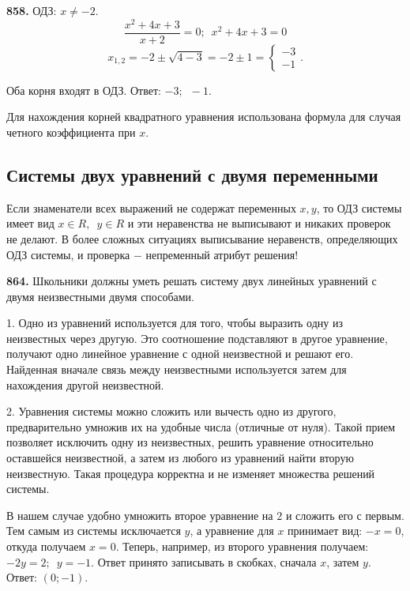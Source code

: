 \textbf{858.} ОДЗ: $x\ne-2$. $$\frac{x^2+4x+3}{x+2}=0;\enspace x^2+4x+3=0$$$$ x_{1,2}=-2\pm \sqrt{4-3}=-2\pm1=\begin{cases} -3 \\ -1 \end{cases}.$$
		
Оба корня входят в ОДЗ. \newline \null \hspace*{\fill} Ответ: $-3;\enspace -1$.

Для нахождения корней квадратного уравнения использована формула для случая четного коэффициента  при $x$. 


\subsection{Системы двух уравнений с двумя переменными}


Если знаменатели всех выражений не содержат переменных $x,y$, то ОДЗ системы имеет вид $x\in R,\enspace y\in R$ и эти неравенства не выписывают и никаких проверок не делают. В более сложных ситуациях выписывание неравенств, определяющих ОДЗ системы, и проверка $-$ непременный атрибут решения!  

\textbf{864.}  Школьники должны уметь решать систему двух линейных уравнений с двумя неизвестными  двумя способами.

1. Одно из уравнений используется для того, чтобы выразить  одну из неизвестных через другую. Это соотношение подставляют в другое уравнение, получают одно линейное уравнение с одной неизвестной и решают его. Найденная вначале связь между неизвестными используется затем для нахождения другой неизвестной.

2. Уравнения системы можно сложить или вычесть одно из другого, предварительно умножив их на удобные числа (отличные от нуля). Такой прием позволяет исключить одну из неизвестных, решить уравнение относительно оставшейся неизвестной, а затем из любого из уравнений найти вторую неизвестную. Такая процедура  корректна и не изменяет множества решений системы. 

В нашем случае удобно умножить второе уравнение на $2$ и сложить его с первым. Тем самым из системы исключается $y$, а уравнение для $x$ принимает вид: $-x=0$, откуда получаем $x=0$. Теперь, например, из второго уравнения получаем: $-2y=2;\enspace y=-1$. Ответ принято записывать в скобках, сначала $x$, затем $y$. \newline \null \hspace*{\fill} Ответ: $(0;-1)$. 

